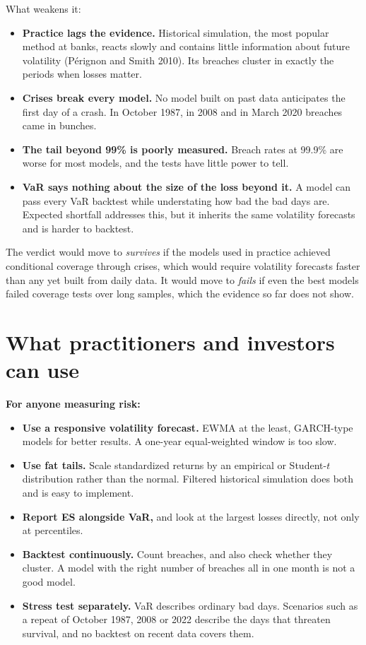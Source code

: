 What weakens it:

\begin{itemize}
  \item \textbf{Practice lags the evidence.} Historical simulation, the most popular method at banks, reacts slowly and contains little information about future volatility (P\'erignon and Smith 2010). Its breaches cluster in exactly the periods when losses matter.
  \item \textbf{Crises break every model.} No model built on past data anticipates the first day of a crash. In October 1987, in 2008 and in March 2020 breaches came in bunches.
  \item \textbf{The tail beyond 99\% is poorly measured.} Breach rates at 99.9\% are worse for most models, and the tests have little power to tell.
  \item \textbf{VaR says nothing about the size of the loss beyond it.} A model can pass every VaR backtest while understating how bad the bad days are. Expected shortfall addresses this, but it inherits the same volatility forecasts and is harder to backtest.
\end{itemize}

The verdict would move to \emph{survives} if the models used in practice achieved conditional coverage through crises, which would require volatility forecasts faster than any yet built from daily data. It would move to \emph{fails} if even the best models failed coverage tests over long samples, which the evidence so far does not show.

\section{What practitioners and investors can use}
\label{sec:13-investors}

\textbf{For anyone measuring risk:}

\begin{itemize}
  \item \textbf{Use a responsive volatility forecast.} EWMA at the least, GARCH-type models for better results. A one-year equal-weighted window is too slow.
  \item \textbf{Use fat tails.} Scale standardized returns by an empirical or Student-$t$ distribution rather than the normal. Filtered historical simulation does both and is easy to implement.
  \item \textbf{Report ES alongside VaR,} and look at the largest losses directly, not only at percentiles.
  \item \textbf{Backtest continuously.} Count breaches, and also check whether they cluster. A model with the right number of breaches all in one month is not a good model.
  \item \textbf{Stress test separately.} VaR describes ordinary bad days. Scenarios such as a repeat of October 1987, 2008 or 2022 describe the days that threaten survival, and no backtest on recent data covers them.
\end{itemize}

